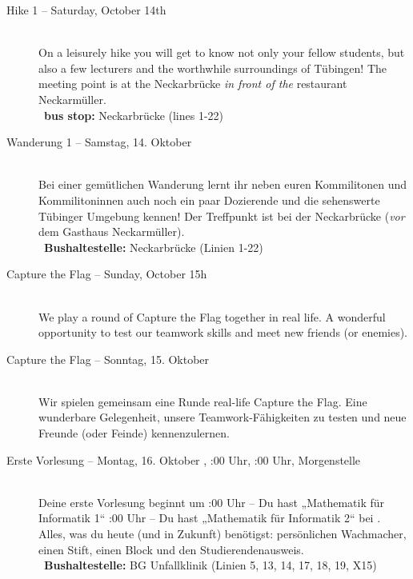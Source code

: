 \begin{description}
\ifml
	\item[Hike 1 -- Saturday, October 14th \YEAR]~\\%
	On a leisurely hike you will get to know not only your fellow students,
	but also a few lecturers and the worthwhile surroundings of Tübingen!
	The meeting point is at the Neckarbrücke \emph{in front of the} restaurant \glqq Neckarmüller\grqq. \\
	~\textbf{bus stop:} Neckarbrücke (lines 1-22)
\else
	\item[Wanderung 1 -- Samstag, 14. Oktober \YEAR]~\\%
	Bei einer gemütlichen Wanderung lernt ihr neben euren Kommilitonen und Kommilitoninnen auch
	noch ein paar Dozierende und die sehenswerte Tübinger Umgebung kennen!
	Der Treffpunkt ist bei der Neckarbrücke (\emph{vor} dem Gasthaus \glqq Neckarmüller\grqq).\\
	~\textbf{Bushaltestelle:} Neckarbrücke (Linien 1-22)
\fi

\ifml
	\item[Capture the Flag -- Sunday, October 15h \YEAR]~\\%
	We play a round of Capture the Flag together in real life.
	A wonderful opportunity to test our teamwork skills and meet new friends (or enemies).
\else
	\item[Capture the Flag -- Sonntag, 15. Oktober \YEAR]~\\%
	Wir spielen gemeinsam eine Runde real-life Capture the Flag.
	Eine wunderbare Gelegenheit, unsere Teamwork-Fähigkeiten zu testen und neue Freunde (oder Feinde) kennenzulernen.
\fi

\ifbachelor
	\item[Erste Vorlesung -- Montag, 16. Oktober \YEAR, \ifwintersemester 8:00 Uhr, \else 10:00 Uhr, \fi Morgenstelle]~\\
	Deine erste Vorlesung beginnt um
	:00 Uhr -- Du hast „Mathematik für Informatik 1“  \fi
	:00 Uhr -- Du hast „Mathematik für Informatik 2“  \fi
	bei \Matheprof.
	Alles, was du heute (und in Zukunft) benötigst: persönlichen Wachmacher, einen Stift, einen Block und den Studierendenausweis.\\
	~\textbf{Bushaltestelle:} BG Unfallklinik (Linien 5, 13, 14, 17, 18, 19, X15)
\fi


\end{description}

